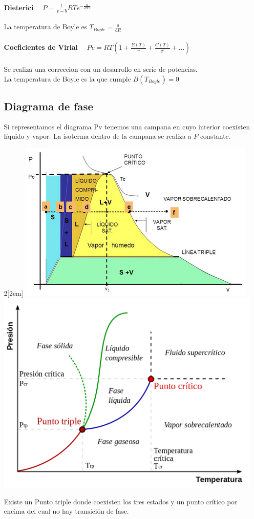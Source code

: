 \documentclass[leqno]{article}
\begin{document}
\noindent
\textbf{Dieterici} \ \
$
\boxed{P = \frac{1}{v-b}RTe^{-\frac{a}{RTv}}}
$\\
\\
La temperatura de Boyle es $T_{Boyle} = \frac{a}{bR}$ \\
\\
\textbf{Coeficientes de Virial} \ \
$
\boxed{Pv = RT(1+ \frac{B(T)}{v} + \frac{C(T)}{v^2} + \ldots)}
$
\\ \\
Se realiza una correccion con un desarrollo en serie de potencias. \\
La temperatura de Boyle es la que cumple $B(T_{Boyle})=0$
\subsection{Diagrama de fase}
Si representamos el diagrama Pv tenemos una campana en cuyo interior coexisten líquido y vapor. La isoterma dentro de la campana se realiza a $P$ constante. 
\newline

\begin{multicols}{2}[\columnsep2em]
\includegraphics[scale=0.5]{images/Pv_fases.png}
\columnbreak
\includegraphics[scale=0.12]{images/PT-fase.png}
\end{multicols}
\noindent
Existe un Punto triple donde coexisten los tres estados y un punto crítico por encima del cual no hay transición de fase.
\end{document}
